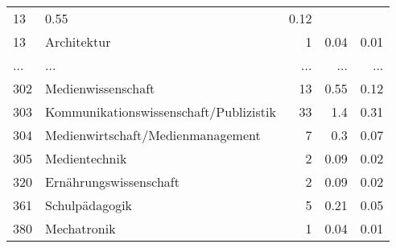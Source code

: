 \begin{longtable}{lXrrr}
          \num{13} &
          \num[round-mode=places,round-precision=2]{0.55} &
          \num[round-mode=places,round-precision=2]{0.12} \\
        13 & \multicolumn{1}{X}{Architektur} & %
          \num{1} &
          \num[round-mode=places,round-precision=2]{0.04} &
          \num[round-mode=places,round-precision=2]{0.01} \\
       ... & ... & ... & ... & ... \\
        302 & \multicolumn{1}{X}{Medienwissenschaft} & %
          \num{13} &
          \num[round-mode=places,round-precision=2]{0.55} &
          \num[round-mode=places,round-precision=2]{0.12} \\

        303 & \multicolumn{1}{X}{Kommunikationswissenschaft/Publizistik} & %
          \num{33} &
          \num[round-mode=places,round-precision=2]{1.4} &
          \num[round-mode=places,round-precision=2]{0.31} \\

        304 & \multicolumn{1}{X}{Medienwirtschaft/Medienmanagement} & %
          \num{7} &
          \num[round-mode=places,round-precision=2]{0.3} &
          \num[round-mode=places,round-precision=2]{0.07} \\

        305 & \multicolumn{1}{X}{Medientechnik} & %
          \num{2} &
          \num[round-mode=places,round-precision=2]{0.09} &
          \num[round-mode=places,round-precision=2]{0.02} \\

        320 & \multicolumn{1}{X}{Ernährungswissenschaft} & %
          \num{2} &
          \num[round-mode=places,round-precision=2]{0.09} &
          \num[round-mode=places,round-precision=2]{0.02} \\

        361 & \multicolumn{1}{X}{Schulpädagogik} & %
          \num{5} &
          \num[round-mode=places,round-precision=2]{0.21} &
          \num[round-mode=places,round-precision=2]{0.05} \\

        380 & \multicolumn{1}{X}{Mechatronik} & %
          \num{1} &
          \num[round-mode=places,round-precision=2]{0.04} &
          \num[round-mode=places,round-precision=2]{0.01} \\


\end{longtable}
